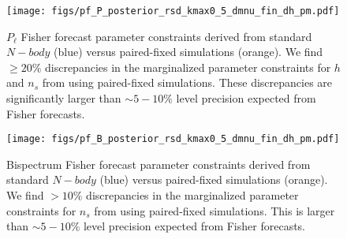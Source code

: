 \documentclass[12pt, letterpaper, preprint]{aastex62}
\begin{document}
\begin{figure}
\begin{center}
    \texttt{[image: figs/pf\_P\_posterior\_rsd\_kmax0\_5\_dmnu\_fin\_dh\_pm.pdf]}
    \caption{$P_\ell$ Fisher forecast parameter constraints derived from standard $N-body$ 
    (blue) versus paired-fixed simulations (orange). We find $\ge 20\%$ discrepancies in the
    marginalized parameter constraints for $h$ and $n_s$ from using paired-fixed simulations.
    These discrepancies are significantly larger than $\sim 5-10\%$ level precision expected 
    from Fisher forecasts. 
    }
\label{fig:ppost_rsd}
\end{center}
\end{figure}

\begin{figure}
\begin{center}
    \texttt{[image: figs/pf\_B\_posterior\_rsd\_kmax0\_5\_dmnu\_fin\_dh\_pm.pdf]} 
    \caption{Bispectrum Fisher forecast parameter constraints derived from standard $N-body$ 
    (blue) versus paired-fixed simulations (orange). We find $> 10\%$ discrepancies in the
    marginalized parameter constraints for $n_s$ from using paired-fixed simulations.
    This is larger than $\sim 5-10\%$ level precision expected from Fisher forecasts. 
    } 
\label{fig:bpost_rsd}
\end{center}
\end{figure}
\end{document}
